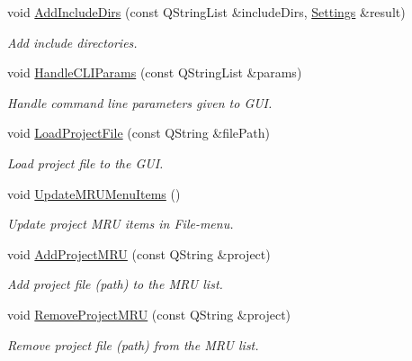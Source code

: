 \begin{DoxyCompactItemize}
void \hyperlink{class_main_window_a090ac31d07b69f8d735a01e887871940}{Add\-Include\-Dirs} (const Q\-String\-List \&include\-Dirs, \hyperlink{class_settings}{Settings} \&result)
\begin{DoxyCompactList}\small\item\em Add include directories. \end{DoxyCompactList}\item 
void \hyperlink{class_main_window_a4f20cd0ca7d94d434037943eaec75d4e}{Handle\-C\-L\-I\-Params} (const Q\-String\-List \&params)
\begin{DoxyCompactList}\small\item\em Handle command line parameters given to G\-U\-I. \end{DoxyCompactList}\item 
void \hyperlink{class_main_window_a0a639aa8f8c7bdba260bac6e3f9c8a05}{Load\-Project\-File} (const Q\-String \&file\-Path)
\begin{DoxyCompactList}\small\item\em Load project file to the G\-U\-I. \end{DoxyCompactList}\item 
void \hyperlink{class_main_window_af1a057f4c085cde46431ae2fbee994b3}{Update\-M\-R\-U\-Menu\-Items} ()
\begin{DoxyCompactList}\small\item\em Update project M\-R\-U items in File-\/menu. \end{DoxyCompactList}\item 
void \hyperlink{class_main_window_ae83ba434084a03088d3328043d1fbd74}{Add\-Project\-M\-R\-U} (const Q\-String \&project)
\begin{DoxyCompactList}\small\item\em Add project file (path) to the M\-R\-U list. \end{DoxyCompactList}\item 
void \hyperlink{class_main_window_aa70f49df9259d6a068757b54b44b4701}{Remove\-Project\-M\-R\-U} (const Q\-String \&project)
\begin{DoxyCompactList}\small\item\em Remove project file (path) from the M\-R\-U list. \end{DoxyCompactList}\end{DoxyCompactItemize}
